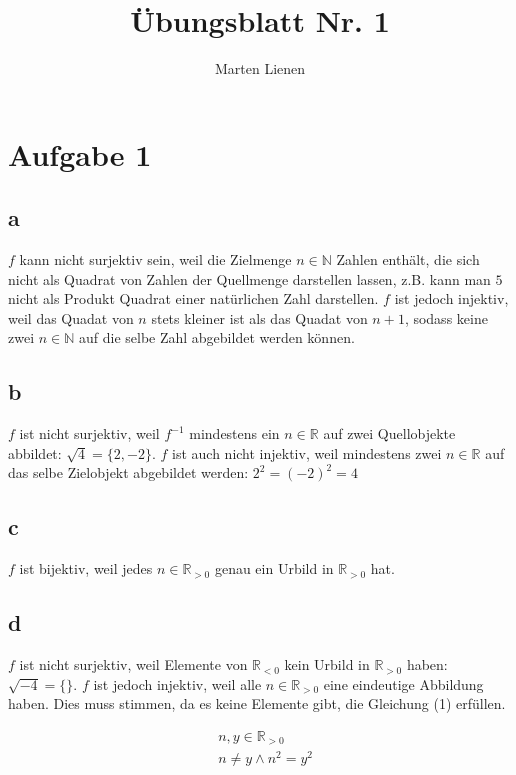 \documentclass[a4paper,10pt]{article}
\title{Übungsblatt Nr. 1}
\author{Marten Lienen}
\begin{document}
\maketitle

\section{Aufgabe 1}

\subsection{a}

$f$ kann nicht surjektiv sein, weil die Zielmenge $n \in \mathbb{N}$ Zahlen enthält, die sich nicht als Quadrat von Zahlen der Quellmenge darstellen lassen, z.B. kann man $5$ nicht als
Produkt Quadrat einer natürlichen Zahl darstellen. $f$ ist jedoch injektiv, weil das Quadat von $n$ stets kleiner ist als das Quadat von $n + 1$, sodass keine zwei $n \in \mathbb{N}$
auf die selbe Zahl abgebildet werden können.

\subsection{b}

$f$ ist nicht surjektiv, weil $f^{-1}$ mindestens ein $n \in \mathbb{R}$ auf zwei Quellobjekte abbildet: $\sqrt{4} = \{2, -2\}$. $f$ ist auch nicht injektiv, weil mindestens zwei
$n \in \mathbb{R}$ auf das selbe Zielobjekt abgebildet werden: $2^2 = (-2)^2 = 4$

\subsection{c}

$f$ ist bijektiv, weil jedes $n \in \mathbb{R}_{> 0}$ genau ein Urbild in $\mathbb{R}_{> 0}$ hat.

\subsection{d}

$f$ ist nicht surjektiv, weil Elemente von $\mathbb{R}_{< 0}$ kein Urbild in $\mathbb{R}_{> 0}$ haben: $\sqrt{-4} = \{\}$. $f$ ist jedoch injektiv, weil alle $n \in \mathbb{R}_{> 0}$
eine eindeutige Abbildung haben. Dies muss stimmen, da es keine Elemente gibt, die Gleichung (1) erfüllen.

\begin{equation}
\begin{aligned}
 &n, y \in \mathbb{R}_{> 0}\\
 &n \ne y \land n^2 = y^2
\end{aligned}
\end{equation}
\end{document}
